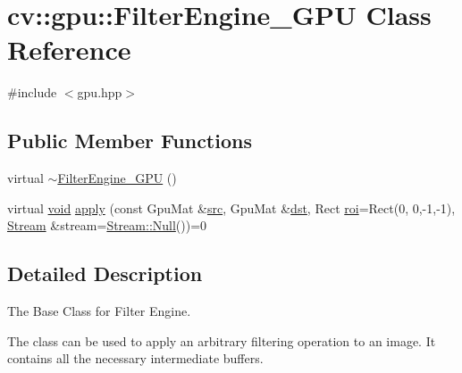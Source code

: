 \hypertarget{classcv_1_1gpu_1_1FilterEngine__GPU}{\section{cv\-:\-:gpu\-:\-:Filter\-Engine\-\_\-\-G\-P\-U Class Reference}
\label{classcv_1_1gpu_1_1FilterEngine__GPU}
}


{\ttfamily \#include $<$gpu.\-hpp$>$}

\subsection*{Public Member Functions}
\begin{DoxyCompactItemize}
\item 
virtual \hyperlink{classcv_1_1gpu_1_1FilterEngine__GPU_a9f94a16322a4a2113fb18765c3e5a34c}{$\sim$\-Filter\-Engine\-\_\-\-G\-P\-U} ()
\item 
virtual \hyperlink{legacy_8hpp_a8bb47f092d473522721002c86c13b94e}{void} \hyperlink{classcv_1_1gpu_1_1FilterEngine__GPU_ab9104348951b8a4c3a2a4c7b60feba46}{apply} (const Gpu\-Mat \&\hyperlink{legacy_8hpp_a371cd109b74033bc4366f584edd3dacc}{src}, Gpu\-Mat \&\hyperlink{photo__c_8h_aed13e2a25279b24dc954073233fef7a5}{dst}, Rect \hyperlink{legacy_8hpp_a22e52b2b51d064865d3ac2f27b308c33}{roi}=Rect(0, 0,-\/1,-\/1), \hyperlink{classcv_1_1gpu_1_1Stream}{Stream} \&stream=\hyperlink{classcv_1_1gpu_1_1Stream_af96c23564834f88333dcb8997df553f1}{Stream\-::\-Null}())=0
\end{DoxyCompactItemize}


\subsection{Detailed Description}
The Base Class for Filter Engine.

The class can be used to apply an arbitrary filtering operation to an image. It contains all the necessary intermediate buffers. 

